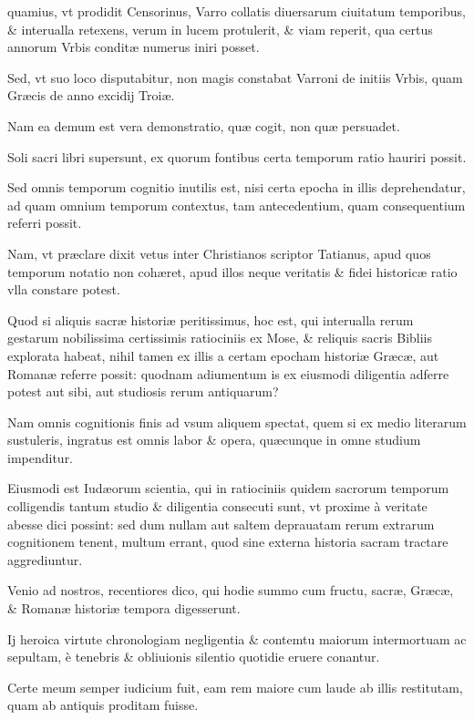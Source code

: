 \begin{parnumbers}

quamius, vt prodidit Censorinus, Varro collatis diuersarum ciuitatum temporibus, \& interualla retexens, verum in lucem protulerit, \& viam reperit, qua certus
annorum Vrbis conditæ numerus iniri posset.

Sed, vt suo loco disputabitur, non magis constabat Varroni de initiis Vrbis, quam Græcis de anno excidij Troiæ.

Nam ea demum est vera demonstratio, quæ cogit, non quæ persuadet.

Soli sacri libri supersunt, ex quorum fontibus certa temporum ratio hauriri possit.

Sed omnis temporum cognitio inutilis est, nisi certa epocha in illis deprehendatur, ad quam omnium temporum contextus, tam antecedentium, quam consequentium referri possit.

Nam, vt præclare dixit vetus inter Christianos scriptor Tatianus, apud quos temporum notatio non cohæret, apud illos neque veritatis \& fidei historicæ ratio vlla constare potest.

Quod si aliquis sacræ historiæ peritissimus, hoc est, qui interualla rerum gestarum
nobilissima certissimis ratiociniis ex Mose, \& reliquis sacris Bibliis explorata habeat, nihil tamen ex illis a certam epocham historiæ Græcæ, aut Romanæ referre possit: quodnam adiumentum is ex eiusmodi diligentia adferre potest aut sibi, aut studiosis rerum antiquarum?

Nam omnis cognitionis finis ad vsum aliquem spectat, quem si ex medio literarum sustuleris, ingratus est omnis labor \& opera, quæcunque in omne studium impenditur.

Eiusmodi est Iudæorum scientia, qui in ratiociniis quidem sacrorum temporum colligendis tantum studio \& diligentia consecuti sunt, vt proxime à veritate abesse dici possint: sed dum nullam aut saltem deprauatam rerum extrarum cognitionem tenent, multum errant, quod sine externa historia sacram tractare
aggrediuntur.

Venio ad nostros, recentiores dico, qui hodie summo cum fructu, sacræ, Græcæ, \& Romanæ historiæ tempora digesserunt.

Ij heroica virtute chronologiam negligentia \& contemtu maiorum intermortuam ac sepultam, è tenebris \& obliuionis silentio quotidie eruere conantur.

Certe meum semper iudicium fuit, eam rem maiore cum laude ab illis restitutam, quam ab antiquis proditam fuisse.


\end{parnumbers}
